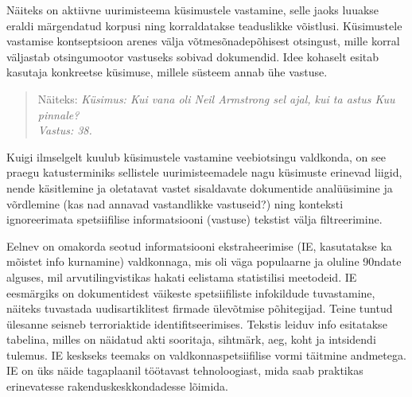 \documentclass[]{../metanetpaper}
\begin{document}
\begin{multicols}{2}


Näiteks on aktiivne uurimisteema küsimustele vastamine, selle jaoks luuakse eraldi märgendatud korpusi ning korraldatakse teaduslikke võistlusi. 
Küsimustele vastamise kontseptsioon arenes välja võtmesõnadepõhisest otsingust, mille korral väljastab otsingumootor vastuseks sobivad dokumendid. 
Idee kohaselt esitab kasutaja konkreetse küsimuse, millele süsteem annab ühe vastuse.

\begin{quote}
Näiteks:
\textit{Küsimus: Kui vana oli Neil Armstrong sel ajal, kui ta astus Kuu pinnale?\\
Vastus: 38.}\\
\end{quote}

Kuigi ilmselgelt kuulub küsimustele vastamine veebiotsingu valdkonda, on see praegu katusterminiks sellistele uurimisteemadele nagu küsimuste erinevad liigid, nende käsitlemine ja oletatavat vastet sisaldavate dokumentide analüüsimine ja võrdlemine (kas nad annavad vastandlikke vastuseid?) ning konteksti ignoreerimata spetsiifilise informatsiooni (vastuse) tekstist välja filtreerimine. 

Eelnev on omakorda seotud informatsiooni ekstraheerimise (IE, kasutatakse ka mõistet info kurnamine) valdkonnaga, mis oli väga populaarne ja oluline 90ndate alguses, mil arvutilingvistikas hakati eelistama statistilisi meetodeid. 
IE eesmärgiks on dokumentidest väikeste spetsiifiliste infokildude tuvastamine, näiteks tuvastada uudisartiklitest firmade ülevõtmise põhitegijad. 
Teine tuntud ülesanne seisneb terroriaktide identifitseerimises. 
Tekstis leiduv info esitatakse tabelina, milles on näidatud akti sooritaja, sihtmärk, aeg, koht ja intsidendi tulemus. 
IE keskseks teemaks on valdkonnaspetsiifilise vormi täitmine andmetega. 
IE on üks näide tagaplaanil töötavast tehnoloogiast, mida saab praktikas erinevatesse rakenduskeskkondadesse lõimida. 


\end{multicols}
\end{document}
